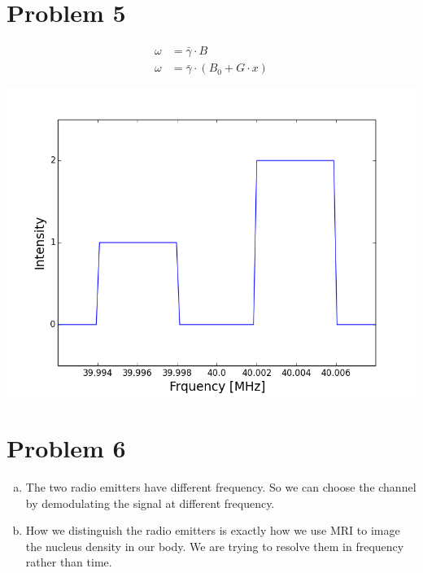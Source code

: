 \documentclass[12pt]{article}
\begin{document}
\section*{Problem 5}
\begin{align*}
\omega &= \bar{\gamma} \cdot B
\\\omega &= \bar{\gamma} \cdot (B_0 + G \cdot x) 
\end{align*}
\begin{center}
\includegraphics[width=0.8 \textwidth]{p5.png}
\end{center}


\section*{Problem 6}
\begin{enumerate}[a)]
\item The two radio emitters have different frequency. So we can choose the channel by demodulating the signal at different frequency.

\item How we distinguish the radio emitters is exactly how we use MRI to image the nucleus density in our body. We are trying to resolve them in frequency rather than time. 
\end{enumerate}
\end{document}
